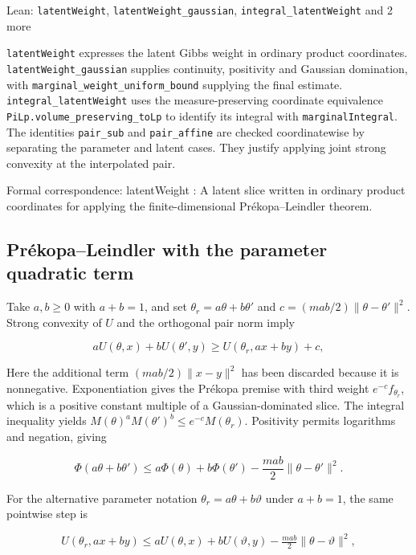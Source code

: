 \documentclass[11pt,a4paper]{report}
\newcommand{\leanlabel}[1]{\par\smallskip\noindent{\small\bfseries #1}\par}
\begin{document}
\begin{leanbox}{Lean: \texttt{latentWeight}, \texttt{latentWeight\_\allowbreak{}gaussian}, \texttt{integral\_\allowbreak{}latentWeight} and 2 more}
\leanlabel{How the Lean proof follows the argument}
\texttt{latent\allowbreak{}Weight} expresses the latent Gibbs weight in ordinary product coordinates. \texttt{latent\allowbreak{}Weight\_\allowbreak{}gaussian} supplies continuity, positivity and Gaussian domination, with \texttt{marginal\_\allowbreak{}weight\_\allowbreak{}uniform\_\allowbreak{}bound} supplying the final estimate. \texttt{integral\_\allowbreak{}latent\allowbreak{}Weight} uses the measure-preserving coordinate equivalence \texttt{Pi\allowbreak{}Lp.\allowbreak{}volume\_\allowbreak{}preserving\_\allowbreak{}to\allowbreak{}Lp} to identify its integral with \texttt{marginal\allowbreak{}Integral}. The identities \texttt{pair\_\allowbreak{}sub} and \texttt{pair\_\allowbreak{}affine} are checked coordinatewise by separating the parameter and latent cases. They justify applying joint strong convexity at the interpolated pair.



Formal correspondence: latentWeight : A latent slice written in ordinary product coordinates for applying the finite-dimensional Prékopa--Leindler theorem.
\end{leanbox}
\subsection{\texorpdfstring{Prékopa–Leindler with the parameter quadratic term}{Prékopa–Leindler with the parameter quadratic term}}
\label{report-step-IPLA-StrongLogConcavity-lean-3}


Take \(a,b\ge0\) with \(a+b=1\), and set \(\theta_r=a\theta+b\theta'\) and \(c=(mab/2)\|\theta-\theta'\|^2\). Strong convexity of \(U\) and the orthogonal pair norm imply

\[aU(\theta,x)+bU(\theta',y)\ge U(\theta_r,ax+by)+c,\]

Here the additional term \((mab/2)\|x-y\|^2\) has been discarded because it is nonnegative. Exponentiation gives the Prékopa premise with third weight \(e^{-c}f_{\theta_r}\), which is a positive constant multiple of a Gaussian-dominated slice. The integral inequality yields \(M(\theta)^aM(\theta')^b\le e^{-c}M(\theta_r)\). Positivity permits logarithms and negation, giving

\[\Phi(a\theta+b\theta')\le a\Phi(\theta)+b\Phi(\theta')-\frac{mab}{2}\|\theta-\theta'\|^2.\]

For the alternative parameter notation \(\theta_r=a\theta+b\vartheta\) under \(a+b=1\), the same pointwise step is

\[U(\theta_r,ax+by)\le aU(\theta,x)+bU(\vartheta,y)-\tfrac{mab}{2}\|\theta-\vartheta\|^2,\]
\end{document}

